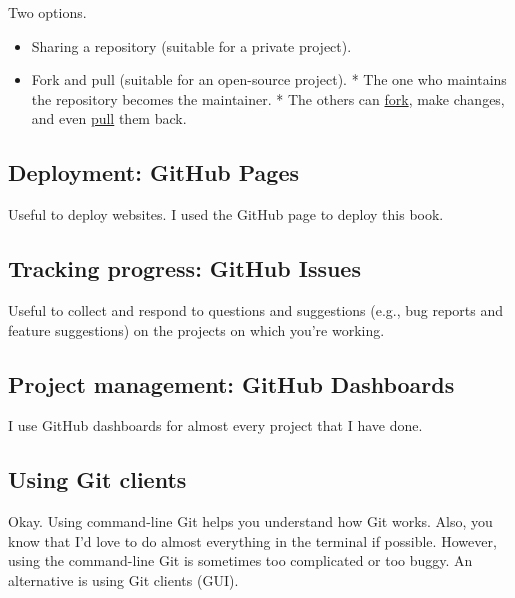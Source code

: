 \documentclass[
]{book}
\providecommand{\tightlist}{%
  \setlength{\itemsep}{0pt}\setlength{\parskip}{0pt}}
\begin{document}
Two options.

\begin{itemize}
\tightlist
\item
  Sharing a repository (suitable for a private project).
\item
  Fork and pull (suitable for an open-source project).
  \hspace{0pt} * The one who maintains the repository becomes the maintainer.
  \hspace{0pt} * The others can \href{https://help.GitHub.com/articles/about-forks/}{fork}, make changes, and even \href{https://help.GitHub.com/articles/about-pull-requests/}{pull} them back.
\end{itemize}

\hypertarget{deployment-github-pages}{%
\subsection{Deployment: GitHub Pages}\label{deployment-github-pages}}

Useful to deploy websites. I used the GitHub page to deploy this book.

\hypertarget{tracking-progress-github-issues}{%
\subsection{Tracking progress: GitHub Issues}\label{tracking-progress-github-issues}}

Useful to collect and respond to questions and suggestions (e.g., bug reports and feature suggestions) on the projects on which you're working.

\hypertarget{project-management-github-dashboards}{%
\subsection{Project management: GitHub Dashboards}\label{project-management-github-dashboards}}

I use GitHub dashboards for almost every project that I have done.

\hypertarget{using-git-clients}{%
\subsection{Using Git clients}\label{using-git-clients}}

Okay. Using command-line Git helps you understand how Git works. Also, you know that I'd love to do almost everything in the terminal if possible. However, using the command-line Git is sometimes too complicated or too buggy. An alternative is using Git clients (GUI).
\end{document}
